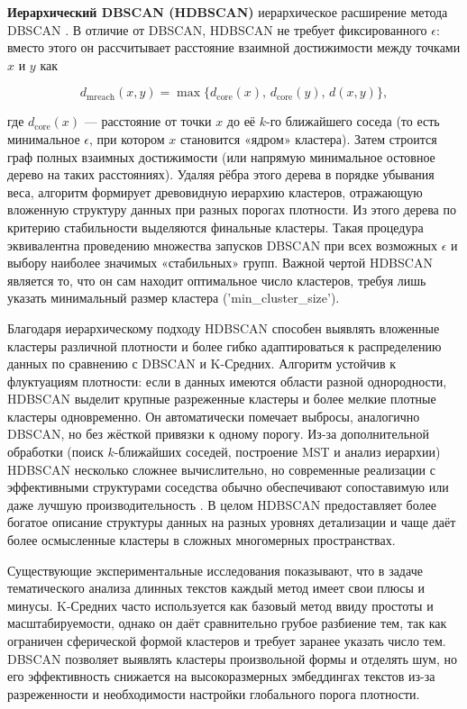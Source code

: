 \textbf{Иерархический DBSCAN (HDBSCAN)} иерархическое расширение метода DBSCAN \parencite{HDBSCAN2013}. В отличие
от DBSCAN, HDBSCAN не требует фиксированного $\epsilon$: вместо этого он рассчитывает расстояние взаимной
достижимости между точками $x$ и $y$ как

\begin{equation}
    d_{\mathrm{mreach}}(x,y) = \max\bigl\{d_{\mathrm{core}}(x),\,d_{\mathrm{core}}(y),\,d(x,y)\bigr\},
\end{equation}

где $d_{\mathrm{core}}(x)$ — расстояние от точки $x$ до её $k$-го ближайшего соседа (то есть минимальное
$\epsilon$, при котором $x$ становится «ядром» кластера). Затем строится граф полных взаимных достижимости
(или напрямую минимальное остовное дерево на таких расстояниях). Удаляя рёбра этого дерева в порядке убывания
веса, алгоритм формирует древовидную иерархию кластеров, отражающую вложенную структуру данных при разных
порогах плотности. Из этого дерева по критерию стабильности выделяются финальные кластеры. Такая процедура
эквивалентна проведению множества запусков DBSCAN при всех возможных $\epsilon$ и выбору наиболее значимых
«стабильных» групп. Важной чертой HDBSCAN является то, что он сам находит оптимальное число кластеров, требуя
лишь указать минимальный размер кластера ('min\_cluster\_size').

Благодаря иерархическому подходу HDBSCAN способен выявлять вложенные кластеры различной плотности и более
гибко адаптироваться к распределению данных по сравнению с DBSCAN и K-Средних. Алгоритм устойчив к флуктуациям
плотности: если в данных имеются области разной однородности, HDBSCAN выделит крупные разреженные кластеры
и более мелкие плотные кластеры одновременно. Он автоматически помечает выбросы, аналогично DBSCAN, но без
жёсткой привязки к одному порогу. Из-за дополнительной обработки (поиск $k$-ближайших соседей, построение MST
и анализ иерархии) HDBSCAN несколько сложнее вычислительно, но современные реализации с эффективными
структурами соседства обычно обеспечивают сопоставимую или даже лучшую производительность
\parencite{HDBSCAN2017software}. В целом HDBSCAN предоставляет более богатое описание структуры данных
на разных уровнях детализации и чаще даёт более осмысленные кластеры в сложных многомерных пространствах.

Существующие экспериментальные исследования показывают, что в задаче тематического анализа длинных текстов
каждый метод имеет свои плюсы и минусы. K-Средних часто используется как базовый метод ввиду простоты
и масштабируемости, однако он даёт сравнительно грубое разбиение тем, так как ограничен сферической формой
кластеров и требует заранее указать число тем. DBSCAN позволяет выявлять кластеры произвольной формы
и отделять шум, но его эффективность снижается на высокоразмерных эмбеддингах текстов из-за разреженности
и необходимости настройки глобального порога плотности.

